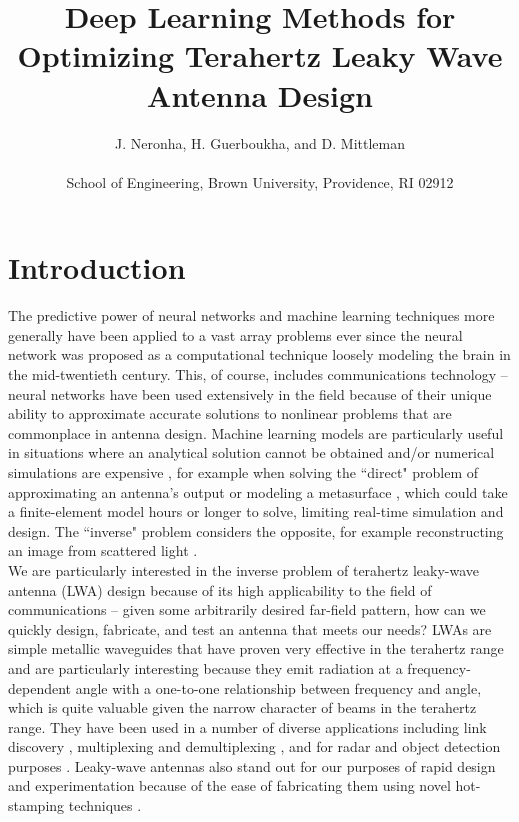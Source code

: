 \documentclass[11pt]{article}
\begin{document}
\title{Deep Learning Methods for Optimizing Terahertz Leaky Wave Antenna Design}
\author{J. Neronha, H. Guerboukha, and D. Mittleman \\ \\ \small School of Engineering, Brown University, Providence, RI 02912}
\date{}

\maketitle

\section*{Introduction}

The predictive power of neural networks and machine learning techniques more generally have been applied to a vast array problems ever since the neural network was proposed as a computational technique loosely modeling the brain in the mid-twentieth century. \cite{McCulloch:1943vq} This, of course, includes communications technology -- neural networks have been used extensively in the field because of their unique ability to approximate accurate solutions to nonlinear problems that are commonplace in antenna design. Machine learning models are particularly useful in situations where an analytical solution cannot be obtained and/or numerical simulations are expensive \cite{Kim, Massa}, for example when solving the ``direct" problem of approximating an antenna's output \cite{8608745} or modeling a metasurface \cite{Nadell:19}, which could take a finite-element model hours or longer to solve, limiting real-time simulation and design. The ``inverse" problem considers the opposite, for example reconstructing an image from scattered light \cite{Sun:18}. \\

\noindent We are particularly interested in the inverse problem of terahertz leaky-wave antenna (LWA) design because of its high applicability to the field of communications -- given some arbitrarily desired far-field pattern, how can we quickly design, fabricate, and test an antenna that meets our needs? LWAs are simple metallic waveguides that have proven very effective in the terahertz range and are particularly interesting because they emit radiation at a frequency-dependent angle with a one-to-one relationship between frequency and angle, which is quite valuable given the narrow character of beams in the terahertz range. \cite{doi:10.1063/5.0033126} They have been used in a number of diverse applications including link discovery \cite{Ghasempour:2020tz}, multiplexing and demultiplexing \cite{Karl:2015uh, Ma:2017vo}, and for radar and object detection purposes \cite{Amarasinghe:20}. Leaky-wave antennas also stand out for our purposes of rapid design and experimentation because of the ease of fabricating them using novel hot-stamping techniques \cite{Guerboukha:21}. \\
\end{document}
